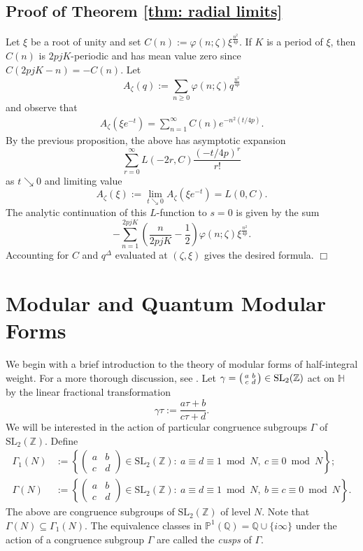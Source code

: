 \documentclass[11pt,letterpaper]{amsart}
\theoremstyle{definition}
\theoremstyle{plain}
\numberwithin{equation}{section}
\theoremstyle{example}
\begin{document}
\subsection{Proof of Theorem \ref{thm: radial limits}}
Let $\xi$ be a root of unity and set $C(n):=\varphi(n;\zeta)\xi^\frac{n^{2}}{4p}$.
If $K$ is a period of $\xi$, then $C(n)$ is $2pjK$-periodic and has mean value zero since
$
C(2pjK-n)
=-C(n).$
Let \begin{equation}A_\zeta(q) := \sum_{n \geq 0} \varphi(n; \zeta)q^\frac{n^2}{4p}
\end{equation} 
and observe that 
\begin{align*}
A_\zeta(\xi e^{-t})=\sum_{n=1}^{\infty}C(n)e^{-n^2(t/4p)}.
\end{align*} By the previous proposition, the above has asymptotic expansion 
\[\sum_{r=0}^{\infty}L(-2r,C)\frac{(-t/4p)^r}{r!}\] as $t\searrow 0$ and limiting value \[A_\zeta(\xi):=\lim_{t\searrow 0}A_\zeta(\xi e^{-t})= L(0,C).\]
The analytic continuation of this $L$-function to $s=0$ is given by the sum
\[ -\sum_{n=1}^{2pjK} \left(\frac{n}{2pjK}-\frac{1}{2} \right) \varphi(n;\zeta)\xi^\frac{n^2}{4p}.
\]
Accounting for $C$ and $q^\Delta$ evaluated at $(\zeta, \xi)$ gives the desired formula. $\Box$ 

\section{Modular and Quantum Modular Forms}\label{sec: modularity discussion}

We begin with a brief introduction to the theory of modular forms of half-integral weight. For a more thorough discussion, see \cite{web, shimura}.
Let $\gamma = \begin{psmallmatrix} a & b \\ c & d \end{psmallmatrix} \in \text{SL}_2(\mathbb{Z})$ act on $\mathbb{H}$ by the linear fractional transformation
\[\gamma\tau := \frac{a \tau + b}{c \tau +d}.\]
We will be interested in the action of particular congruence subgroups $\Gamma$ of $\text{SL}_2(\mathbb{Z})$. Define 
\begin{align*}
\Gamma_1(N)&:= \left\{\begin{pmatrix} a & b \\ c & d
\end{pmatrix} \in \text{SL}_2(\mathbb{Z}) : \ a \equiv d \equiv 1 \bmod{N}, \ c \equiv 0 \bmod{N}\right\}; \\ \Gamma(N)&:= \left\{\begin{pmatrix} a & b \\ c & d
\end{pmatrix} \in \text{SL}_2(\mathbb{Z}) : \ a \equiv d \equiv 1 \bmod{N}, \ b \equiv c \equiv 0 \bmod{N}\right\}.
\end{align*}
The above are congruence subgroups of $\text{SL}_2(\mathbb{Z})$ of level $N$. Note that $\Gamma(N) \subseteq \Gamma_1(N)$. The equivalence classes in $\mathbb{P}^1(\mathbb{Q}) = \mathbb{Q} \cup \{ i \infty \}$ under the action of a congruence subgroup $\Gamma$ are called the \textit{cusps} of $\Gamma$. 
\end{document}
